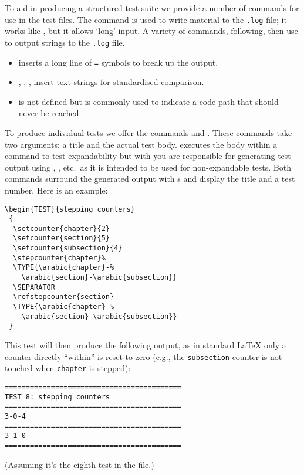 \documentclass[final]{ltugboat}
\begin{document}
To aid in producing a structured test suite we provide a number of
commands for use in the test files.  The  command is used to write
material to the \texttt{.log} file; it works like , but it
allows `long' input.
%
A variety of commands, following, then use  to output strings
to the \texttt{.log} file.
\begin{itemize}
\item
{} inserts a long line of \texttt{=} symbols to break up
the output.
\item
{}, , ,  insert text strings for
standardised comparison.
\item
{} is not defined but is commonly used to indicate a code path
that should never be reached.
\end{itemize}
To produce individual tests we offer the commands  and
. These commands take two arguments: a title
and the actual test body.   executes the body within a
 command to test expandability but with  you are
responsible for generating test output using , ,
etc.\ as it is intended to be used for non-expandable tests.
Both  commands  surround the generated output with s and 
display the title and a test number. Here is an example:
\begin{Verbatim}
\begin{TEST}{stepping counters}
 {
  \setcounter{chapter}{2}
  \setcounter{section}{5}
  \setcounter{subsection}{4}
  \stepcounter{chapter}%
  \TYPE{\arabic{chapter}-%
    \arabic{section}-\arabic{subsection}}
  \SEPARATOR
  \refstepcounter{section}
  \TYPE{\arabic{chapter}-%
    \arabic{section}-\arabic{subsection}}
 }
\end{Verbatim}
This test will then produce the following output, as in standard \LaTeX{} only
a counter directly ``within'' is reset to zero (e.g., the
\texttt{subsection} counter is not touched when \texttt{chapter} is stepped):
\begin{Verbatim}
==========================================
TEST 8: stepping counters
==========================================
3-0-4
==========================================
3-1-0
==========================================
\end{Verbatim}
(Assuming it's the eighth test in the file.)



\end{document}

